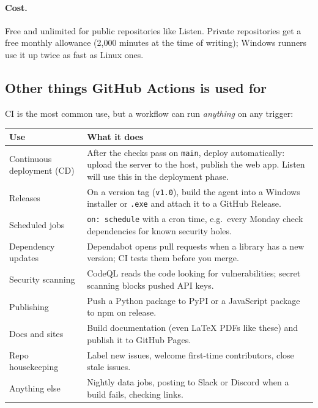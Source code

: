 \documentclass[11pt,a4paper]{article}
\begin{document}
\paragraph{Cost.} Free and unlimited for public repositories like Listen. Private repositories
get a free monthly allowance (2{,}000 minutes at the time of writing); Windows runners use it up
twice as fast as Linux ones.

\subsection{Other things GitHub Actions is used for}
CI is the most common use, but a workflow can run \emph{anything} on any trigger:
\begin{center}
\small
\renewcommand{\arraystretch}{1.2}
\begin{tabularx}{\textwidth}{>{\raggedright\arraybackslash}p{3.4cm} X}
\toprule
\textbf{Use} & \textbf{What it does} \\
\midrule
Continuous deployment (CD) & After the checks pass on \texttt{main}, deploy automatically: upload the server to the host, publish the web app. Listen will use this in the deployment phase. \\
Releases & On a version tag (\texttt{v1.0}), build the agent into a Windows installer or \texttt{.exe} and attach it to a GitHub Release. \\
Scheduled jobs & \texttt{on: schedule} with a cron time, e.g.\ every Monday check dependencies for known security holes. \\
Dependency updates & Dependabot opens pull requests when a library has a new version; CI tests them before you merge. \\
Security scanning & CodeQL reads the code looking for vulnerabilities; secret scanning blocks pushed API keys. \\
Publishing & Push a Python package to PyPI or a JavaScript package to npm on release. \\
Docs and sites & Build documentation (even LaTeX PDFs like these) and publish it to GitHub Pages. \\
Repo housekeeping & Label new issues, welcome first-time contributors, close stale issues. \\
Anything else & Nightly data jobs, posting to Slack or Discord when a build fails, checking links. \\
\bottomrule
\end{tabularx}
\end{center}
\end{document}

